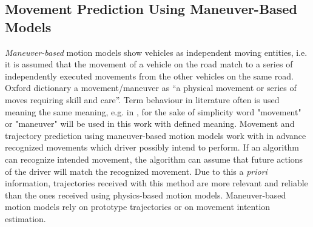 \subsection{Movement Prediction Using Maneuver-Based Models}
\label{subsection:mb}

\textit{Maneuver-based} motion models show vehicles as independent moving entities, i.e. it is assumed that the movement of a vehicle on the road match to a series of independently executed movements from the other vehicles on the same road. Oxford dictionary \cite{def} a movement/maneuver as “a physical movement or series of moves requiring skill and care”. Term behaviour in literature often is used meaning the same meaning, e.g. in \cite{beh1, beh2, beh3}, for the sake of simplicity word "movement" or "maneuver" will be used in this work with defined meaning. Movement and trajectory prediction using maneuver-based motion models work with in advance recognized movements which driver possibly intend to perform. If an algorithm can recognize intended movement, the algorithm can assume that future actions of the driver will match the recognized movement. Due to this a \textit{priori} information, trajectories received with this method are more relevant and reliable than the ones received using physics-based motion models.  Maneuver-based motion models rely on prototype trajectories or on movement intention estimation. \\
